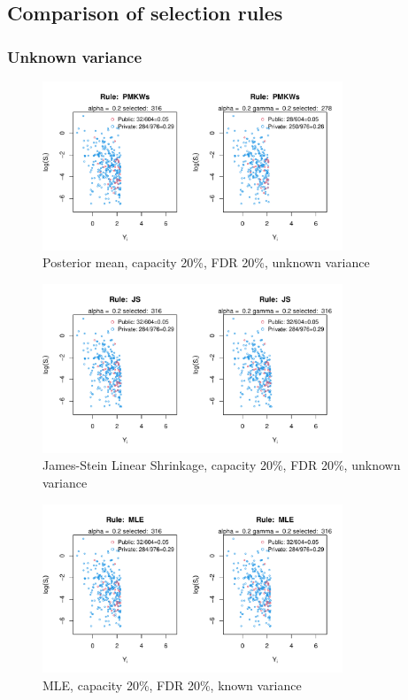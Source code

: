 \documentclass[12pt]{article}
\begin{document}
\subsection{Comparison of selection rules}

\newpage
\subsubsection{Unknown variance}
\label{section:unknown}

\begin{figure}[h!]
    \centering
    \includegraphics[width=0.8\textwidth]{../../Figures/2013-2022/GMM_fd/GLVmix/Left_0.2_0.2_PMKWs.pdf}
    \caption{Posterior mean, capacity 20\%, FDR 20\%, unknown variance}
\end{figure}

\begin{figure}[h!]
    \centering
    \includegraphics[width=0.8\textwidth]{../../Figures/2013-2022/GMM_fd/GLVmix/Left_0.2_0.2_JS.pdf}
    \caption{James-Stein Linear Shrinkage, capacity 20\%, FDR 20\%, unknown variance}
\end{figure}

\begin{figure}[h!]
    \centering
    \includegraphics[width=0.8\textwidth]{../../Figures/2013-2022/GMM_fd/GLVmix/Left_0.2_0.2_MLE.pdf}
    \caption{MLE, capacity 20\%, FDR 20\%, known variance}
\end{figure}
\end{document}
